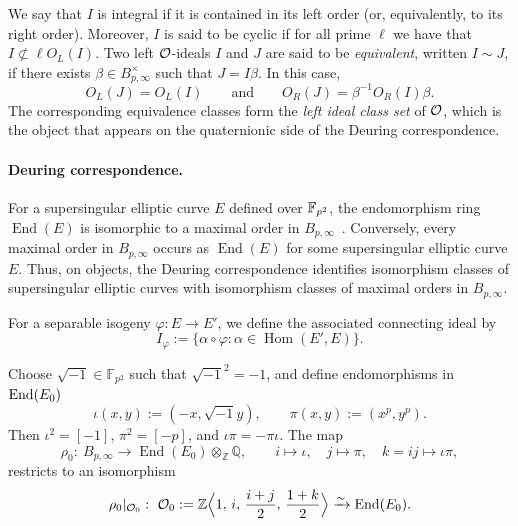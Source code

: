 We say that $I$ is integral if it is contained in its left order (or, equivalently, to its right order).
Moreover, $I$ is said to be cyclic if for all prime $\ell$ we have that $I\not\subset\ell O_L(I)$.
Two left \(\mathcal{O}\)-ideals \(I\) and \(J\) are said to be \emph{equivalent}, written
\(I\sim J\), if there exists \(\beta\in B_{p,\infty}^{\times}\) such that $J=I\beta$.
In this case,
\[
O_L(J)=O_L(I)
\qquad\text{and}\qquad
O_R(J)=\beta^{-1}O_R(I)\beta.
\]
The corresponding equivalence classes form the \emph{left ideal class set} of \(\mathcal{O}\),
which is the object that appears on the quaternionic side of the Deuring correspondence.

\paragraph{Deuring correspondence.}

For a supersingular elliptic curve \(E\) defined over $\mathbb{F}_{p^2}$, the endomorphism ring
\(\operatorname{End}(E)\) is isomorphic to a maximal order in \(B_{p,\infty}\)~\cite{Deu41}.
Conversely, every maximal order in \(B_{p,\infty}\) occurs as
\(\operatorname{End}(E)\) for some supersingular elliptic curve \(E\).
Thus, on objects, the Deuring correspondence identifies isomorphism classes of supersingular elliptic curves with isomorphism classes of maximal orders in \(B_{p,\infty}\).

For a separable isogeny
\(\varphi:E\to E'\), we define the associated connecting ideal by
\[
I_\varphi:=\{\alpha\circ\varphi:\alpha\in \operatorname{Hom}(E',E)\}.
\]

Choose \(\sqrt{-1}\in\mathbb{F}_{p^2}\) such
that \(\sqrt{-1}^2=-1\), and define endomorphisms in $\mathrm{End}(E_0)$
\[
\iota(x,y):=(-x,\sqrt{-1} y),
\qquad
\pi(x,y):=(x^p,y^p).
\]
Then \(\iota^2=[-1]\), \(\pi^2=[-p]\), and \(\iota\pi=-\pi\iota\). The map
\[
\rho_0:\ B_{p,\infty}\longrightarrow
\operatorname{End}(E_0)\otimes_{\mathbb{Z}}\mathbb{Q},
\qquad
i\mapsto \iota,\quad j\mapsto \pi,\quad k=ij\mapsto \iota\pi,
\]
restricts to an isomorphism~\cite{Ibu82}
\[
\rho_0|_{\mathcal{O}_0}:\ \mathcal O_0:=
\mathbb{Z}\Big\langle 1,\, i,\, \frac{i+j}{2},\, \frac{1+k}{2}\Big\rangle
\xrightarrow{\sim} \operatorname{End}(E_0).
\]

